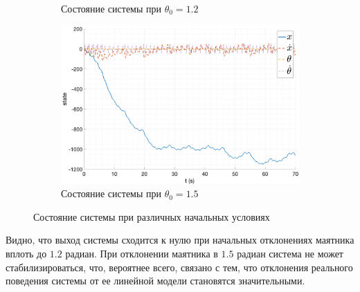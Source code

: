 \begin{figure}[ht!]
\begin{subfigure}[b]{0.45\textwidth}
        \caption{Состояние системы при $\theta_0 = 1.2$}
    \end{subfigure}
    \begin{subfigure}[b]{0.45\textwidth}
        \centering
        \includegraphics[width=\textwidth]{media/plots/LQR/state_5.png}
        \caption{Состояние системы при $\theta_0 = 1.5$}
    \end{subfigure}
    \caption{Состояние системы при различных начальных условиях}
    \label{fig:lqr_controller_2_state}
\end{figure}

Видно, что выход системы сходится к нулю при начальных отклонениях маятника вплоть до $1.2$ радиан.
При отклонении маятника в $1.5$ радиан система не может стабилизироваться, что, вероятнее всего, 
связано с тем, что отклонения реального поведения системы от ее линейной модели становятся значительными. 

